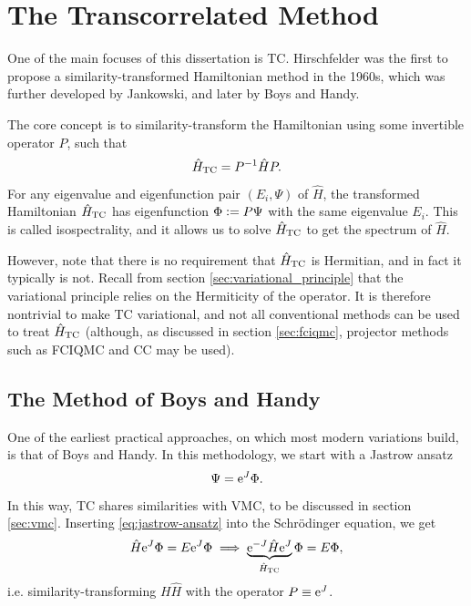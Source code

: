 \section{The Transcorrelated Method}
\label{sec:tc}

One of the main focuses of this dissertation is \gls{TC}. Hirschfelder was the first to propose a similarity-transformed Hamiltonian method in the 1960s,\cite{hirschfelderRemoval1963} which was further developed by Jankowski,\supercite{Jankowski1967,Jankowski1970} and later by Boys and Handy.\supercite{boysCalculation1969,boysCondition1969,boysDetermination1969,boysFirst1969}

The core concept is to similarity-transform the Hamiltonian using some invertible operator $P$, such that
\begin{equation}
    \hat H_\mathrm{TC} = P^{-1}\hat HP.
\end{equation}
For any eigenvalue and eigenfunction pair $(E_i,\Psi)$ of $\hat H$, the transformed Hamiltonian $\hat H_\mathrm{TC}$ has eigenfunction $\Phi\mathrel{\mathop:}= P\Psi$ with the same eigenvalue $E_i$. This is called isospectrality, and it allows us to solve $\hat H_\mathrm{TC}$ to get the spectrum of $\hat H$.

However, note that there is no requirement that $\hat H_\mathrm{TC}$ is Hermitian, and in fact it typically is not. Recall from section \ref{sec:variational_principle} that the variational principle relies on the Hermiticity of the operator. It is therefore nontrivial to make \gls{TC} variational, and not all conventional methods can be used to treat $\hat H_\mathrm{TC}$ (although, as discussed in section \ref{sec:fciqmc}, projector methods such as FCIQMC and CC may be used).

\subsection{The Method of Boys and Handy}

One of the earliest practical approaches, on which most modern variations build, is that of Boys and Handy.\supercite{boysCalculation1969,boysCondition1969,boysDetermination1969,boysFirst1969} In this methodology, we start with a Jastrow ansatz\cite{jastrowManyBody1955}
\begin{equation}
    \label{eq:jastrow-ansatz}
    \Psi = \mathrm{e}^J\Phi.
\end{equation}
In this way, TC shares similarities with \gls{VMC}, to be discussed in section \ref{sec:vmc}. Inserting \ref{eq:jastrow-ansatz} into the Schrödinger equation, we get
\begin{equation}
    \hat H \mathrm{e}^J\Phi = E\mathrm{e}^J\Phi \implies \underbrace{\mathrm{e}^{-J}\hat H\mathrm{e}^J}_{\hat H_\mathrm{TC}}\Phi = E\Phi,
\end{equation}
i.e. similarity-transforming $H\hat H$ with the operator $P\equiv\mathrm{e}^J$.

